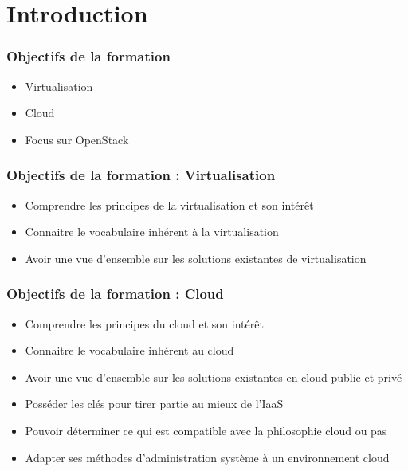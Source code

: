   \section*{Introduction}
  \begin{frame}
    \frametitle{Objectifs de la formation}
    \begin{itemize}
      \item Virtualisation
      \item Cloud
      \item Focus sur OpenStack
    \end{itemize}
  \end{frame}
  
  \begin{frame}
    \frametitle{Objectifs de la formation : Virtualisation}
    \begin{itemize}
      \item Comprendre les principes de la virtualisation et son intérêt
      \item Connaitre le vocabulaire inhérent à la virtualisation
      \item Avoir une vue d'ensemble sur les solutions existantes de virtualisation
    \end{itemize}
  \end{frame}
  
  \begin{frame}
    \frametitle{Objectifs de la formation : Cloud}
    \begin{itemize}
      \item Comprendre les principes du cloud et son intérêt
      \item Connaitre le vocabulaire inhérent au cloud
      \item Avoir une vue d'ensemble sur les solutions existantes en cloud public et privé
      \item Posséder les clés pour tirer partie au mieux de l'IaaS
      \item Pouvoir déterminer ce qui est compatible avec la philosophie cloud ou pas
      \item Adapter ses méthodes d'administration système à un environnement cloud
    \end{itemize}
  \end{frame}

